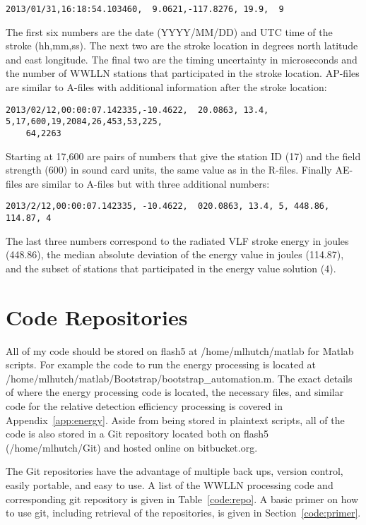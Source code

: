 \begin{verbatim}
2013/01/31,16:18:54.103460,  9.0621,-117.8276, 19.9,  9
\end{verbatim}

The first six numbers are the date (YYYY/MM/DD) and UTC time of the stroke (hh,mm,ss).
The next two are the stroke location in degrees north latitude and east longitude.
The final two are the timing uncertainty in microseconds and the number of WWLLN stations that participated in the stroke location.
AP-files are similar to A-files with additional information after the stroke location:

\begin{verbatim}
2013/02/12,00:00:07.142335,-10.4622,  20.0863, 13.4,  5,17,600,19,2084,26,453,53,225,
	64,2263
\end{verbatim}

Starting at 17,600 are pairs of numbers that give the station ID (17) and the field strength (600) in sound card units, the same value as in the R-files. Finally AE-files are similar to A-files but with three additional numbers:

\begin{verbatim}
2013/2/12,00:00:07.142335, -10.4622,  020.0863, 13.4, 5, 448.86, 114.87, 4
\end{verbatim}

The last three numbers correspond to the radiated VLF stroke energy in joules (448.86), the median absolute deviation of the energy value in joules (114.87), and the subset of stations that participated in the energy value solution (4).

\section{Code Repositories}

All of my code should be stored on flash5 at /home/mlhutch/matlab for Matlab scripts.
For example the code to run the energy processing is located at /home/mlhutch/matlab/Bootstrap/bootstrap\_automation.m.
The exact details of where the energy processing code is located, the necessary files, and similar code for the relative detection efficiency processing is covered in Appendix~\ref{app:energy}.
Aside from being stored in plaintext scripts, all of the code is also stored in a Git repository located both on flash5 (/home/mlhutch/Git) and hosted online on bitbucket.org.

The Git repositories have the advantage of multiple back ups, version control, easily portable, and easy to use.
A list of the WWLLN processing code and corresponding git repository is given in Table~\ref{code:repo}.
A basic primer on how to use git, including retrieval of the repositories, is given in Section~\ref{code:primer}.


